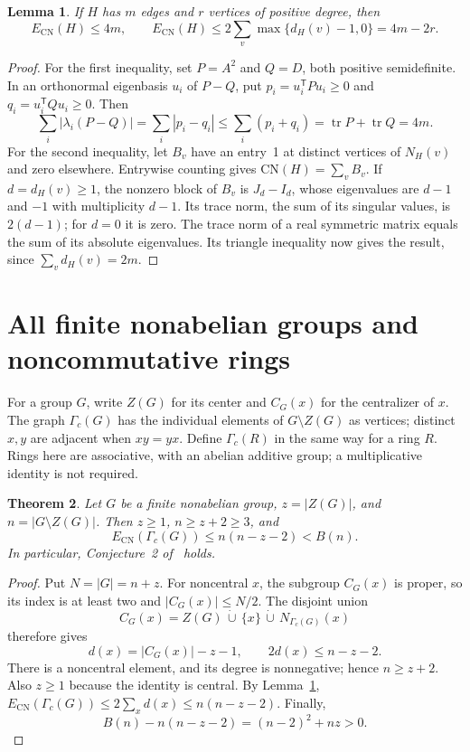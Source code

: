 \documentclass[11pt]{article}
\newtheorem{theorem}{Theorem}
\newtheorem{lemma}[theorem]{Lemma}
\newcommand{\ECN}{E_{\mathrm{CN}}}
\newcommand{\CN}{\mathrm{CN}}
\begin{document}
\begin{lemma}\label{lem:bounds}
If $H$ has $m$ edges and $r$ vertices of positive degree, then
\[
 \ECN(H)\le4m,\qquad
 \ECN(H)\le2\sum_v\max\{d_H(v)-1,0\}=4m-2r.
\]
\end{lemma}
\begin{proof}
For the first inequality, set $P=A^2$ and $Q=D$, both positive
semidefinite. In an orthonormal eigenbasis $u_i$ of $P-Q$, put
$p_i=u_i^{\mathsf T}Pu_i\ge0$ and $q_i=u_i^{\mathsf T}Qu_i\ge0$.
Then
\[
 \sum_i|\lambda_i(P-Q)|=\sum_i|p_i-q_i|
 \le\sum_i(p_i+q_i)=\operatorname{tr}P+\operatorname{tr}Q=4m.
\]
For the second inequality, let $B_v$ have an entry~1 at distinct
vertices of $N_H(v)$ and zero elsewhere. Entrywise counting gives
$\CN(H)=\sum_v B_v$. If $d=d_H(v)\ge1$, the nonzero block of $B_v$
is $J_d-I_d$, whose eigenvalues are $d-1$ and $-1$ with multiplicity
$d-1$. Its trace norm, the sum of its singular values, is $2(d-1)$;
for $d=0$ it is zero. The trace norm of a real symmetric matrix equals
the sum of its absolute eigenvalues. Its triangle inequality
\cite[Lemma~4.2]{JND} now gives
the result, since $\sum_v d_H(v)=2m$.
\end{proof}

\section{All finite nonabelian groups and noncommutative rings}
For a group $G$, write $Z(G)$ for its center and $C_G(x)$ for the
centralizer of $x$. The graph $\Gamma_c(G)$ has the individual elements
of $G\setminus Z(G)$ as vertices; distinct $x,y$ are adjacent when
$xy=yx$. Define $\Gamma_c(R)$ in the same way for a ring $R$.
Rings here are associative, with an abelian additive group; a
multiplicative identity is not required.

\begin{theorem}\label{thm:groups}
Let $G$ be a finite nonabelian group, $z=|Z(G)|$, and
$n=|G\setminus Z(G)|$. Then $z\ge1$, $n\ge z+2\ge3$, and
\begin{equation}\label{eq:main}
 \ECN(\Gamma_c(G))\le n(n-z-2)<B(n).
\end{equation}
In particular, Conjecture~2 of~\cite[Section~4, p.~11]{NFDS} holds.
\end{theorem}
\begin{proof}
Put $N=|G|=n+z$. For noncentral $x$, the subgroup $C_G(x)$ is proper,
so its index is at least two and $|C_G(x)|\le N/2$. The disjoint union
\[
 C_G(x)=Z(G)\,\dot\cup\,\{x\}\,\dot\cup\,N_{\Gamma_c(G)}(x)
\]
therefore gives
\begin{equation}\label{eq:degree}
 d(x)=|C_G(x)|-z-1,\qquad 2d(x)\le n-z-2.
\end{equation}
There is a noncentral element, and its degree is nonnegative; hence
$n\ge z+2$. Also $z\ge1$ because the identity is central.
By Lemma~\ref{lem:bounds},
$\ECN(\Gamma_c(G))\le2\sum_xd(x)\le n(n-z-2)$.
Finally,
\[
 B(n)-n(n-z-2)=(n-2)^2+nz>0.
\]
\end{proof}
\end{document}
